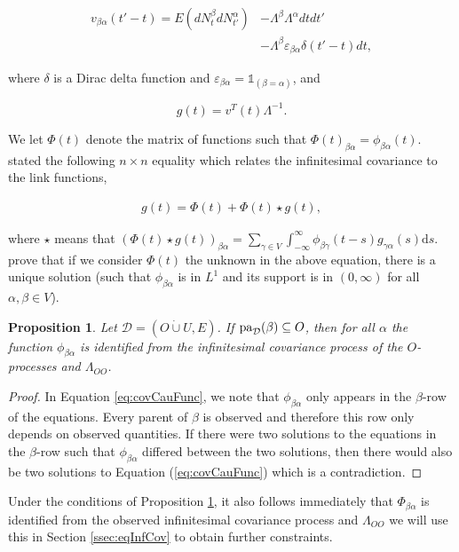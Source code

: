 \documentclass[accepted]{uai2021} %
\newcommand{\md}{\mathrm{d}}
\newtheorem{prop}[thm]{Proposition}
\newcommand{\pa}{\textnormal{pa}}
\newcommand{\disjU}{\mathbin{\dot{\cup}}}
\begin{document}
\begin{align}
	v_{\beta\alpha}(t' - t) = E(dN_t^\beta dN_{t'}^\alpha) & - 
	\Lambda^\beta\Lambda^\alpha dt dt' \nonumber \\ & - \Lambda^\beta 
	\varepsilon_{\beta\alpha}
	\delta(t'-t) dt,
	\label{eq:infv}
\end{align}


where $\delta$ is a Dirac delta function and $\varepsilon_{\beta\alpha} = 
\mathds{1}_{(\beta=\alpha)}$, and

$$
g(t) = v^T(t)\Lambda^{-1}.
$$

We let $\Phi(t)$ denote the matrix of functions such that 
$\Phi(t)_{\beta\alpha} = 
\phi_{\beta\alpha}(t)$. \cite{hawkesJRSSB1971} stated the following $n\times n$ 
equality 
which 
relates the infinitesimal covariance to the link functions,

\begin{align}
	g(t) = \Phi(t) + \Phi(t) \star g(t),
	\label{eq:covCauFunc}
\end{align}

where $\star$ means that $(\Phi(t) \star g(t))_{\beta\alpha} = \sum_{\gamma \in 
V} 
\int_{-\infty}^{\infty} \phi_{\beta\gamma}(t - s) g_{\gamma\alpha}(s) \md s$. 
\cite{bacry2016} 
prove that if we consider $\Phi(t)$ 
the 
unknown in the above equation, there is a unique solution (such that 
$\phi_{\beta\alpha}$ is in $L^1$ and its support is in $(0,\infty)$ for all 
$\alpha,\beta\in V$).

\begin{prop}
	Let $\mathcal{D} = (O\disjU U, E)$. If $\pa_\mathcal{D}(\beta) \subseteq 
	O$, then for all $\alpha$ the function $\phi_{\beta\alpha}$ is identified 
	from 
	the infinitesimal covariance process of the $O$-processes and 
	$\Lambda_{OO}$.
	\label{prop:gPaId}
\end{prop}

\begin{proof}
	In Equation \ref{eq:covCauFunc}, we note that $\phi_{\beta\alpha}$ only 
	appears in the $\beta$-row of the equations. Every parent of $\beta$ is 
	observed and therefore this row only depends on observed quantities. If 
	there were two solutions to the equations in the $\beta$-row such that 
	$\phi_{\beta\alpha}$ differed between the two solutions, then there would 
	also 
	be two solutions to Equation (\ref{eq:covCauFunc}) which is a contradiction.
\end{proof}

Under the conditions of Proposition \ref{prop:gPaId}, it also follows 
immediately that $\Phi_{\beta\alpha}$ is identified from the observed 
infinitesimal covariance process and $\Lambda_{OO}$ we will use this in Section 
\ref{ssec:eqInfCov} to obtain further constraints.
\end{document}
